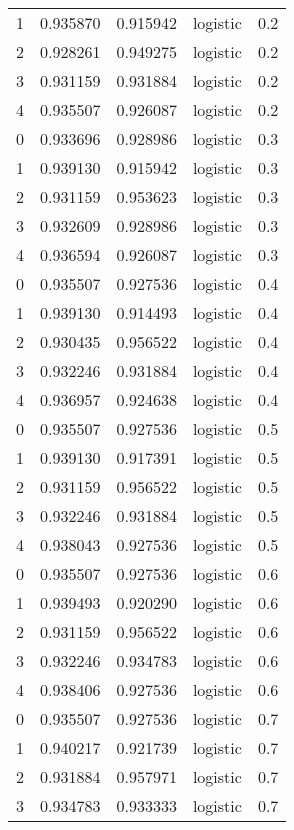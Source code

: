 \begin{tabular}{rrrlr}
     1 & 0.935870 & 0.915942 & logistic &        0.2 \\
     2 & 0.928261 & 0.949275 & logistic &        0.2 \\
     3 & 0.931159 & 0.931884 & logistic &        0.2 \\
     4 & 0.935507 & 0.926087 & logistic &        0.2 \\
     0 & 0.933696 & 0.928986 & logistic &        0.3 \\
     1 & 0.939130 & 0.915942 & logistic &        0.3 \\
     2 & 0.931159 & 0.953623 & logistic &        0.3 \\
     3 & 0.932609 & 0.928986 & logistic &        0.3 \\
     4 & 0.936594 & 0.926087 & logistic &        0.3 \\
     0 & 0.935507 & 0.927536 & logistic &        0.4 \\
     1 & 0.939130 & 0.914493 & logistic &        0.4 \\
     2 & 0.930435 & 0.956522 & logistic &        0.4 \\
     3 & 0.932246 & 0.931884 & logistic &        0.4 \\
     4 & 0.936957 & 0.924638 & logistic &        0.4 \\
     0 & 0.935507 & 0.927536 & logistic &        0.5 \\
     1 & 0.939130 & 0.917391 & logistic &        0.5 \\
     2 & 0.931159 & 0.956522 & logistic &        0.5 \\
     3 & 0.932246 & 0.931884 & logistic &        0.5 \\
     4 & 0.938043 & 0.927536 & logistic &        0.5 \\
     0 & 0.935507 & 0.927536 & logistic &        0.6 \\
     1 & 0.939493 & 0.920290 & logistic &        0.6 \\
     2 & 0.931159 & 0.956522 & logistic &        0.6 \\
     3 & 0.932246 & 0.934783 & logistic &        0.6 \\
     4 & 0.938406 & 0.927536 & logistic &        0.6 \\
     0 & 0.935507 & 0.927536 & logistic &        0.7 \\
     1 & 0.940217 & 0.921739 & logistic &        0.7 \\
     2 & 0.931884 & 0.957971 & logistic &        0.7 \\
     3 & 0.934783 & 0.933333 & logistic &        0.7 \\

\end{tabular}
